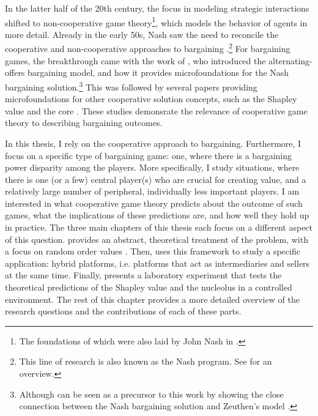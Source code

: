 In the latter half of the 20th century, the focus in modeling strategic interactions shifted to non-cooperative game theory\footnote{
    The foundations of which were also laid by John Nash in \textcite{nash1950non}.
}, which models the behavior of agents in more detail.
Already in the early 50s, Nash saw the need to reconcile the cooperative and non-cooperative approaches to bargaining \parencite{nash1953two}.\footnote{
    This line of research is also known as the Nash program.
    See \textcite{serrano2021sixty} for an overview.
}
For bargaining games, the breakthrough came with the work of \textcite{rubinstein1982perfect}, who introduced the alternating-offers bargaining model, and how it provides microfoundations for the Nash bargaining solution.\footnote{
    Although \textcite{harsanyi1956approaches} can be seen as a precursor to this work by showing the close connection between the Nash bargaining solution \parencite{nash1950bargaining} and Zeuthen's model \parencite{zeuthen1930problems}.
}
This was followed by several papers providing microfoundations for other cooperative solution concepts, such as the Shapley value \parencite[e.g.,][]{gul1989bargaining,winter1994demand,hart1996bargaining,stole1996intra} and the core \parencite[e.g.,][]{serrano1995market}.
These studies demonsrate the relevance of cooperative game theory to describing bargaining outcomes.

In this thesis, I rely on the cooperative approach to bargaining.
Furthermore, I focus on a specific type of bargaining game: one, where there is a bargaining power disparity among the players.
More specifically, I study situations, where there is one (or a few) central player(s) who are crucial for creating value, and a relatively large number of peripheral, individually less important players.
I am interested in what cooperative game theory predicts about the outcome of such games, what the implications of these predictions are, and how well they hold up in practice.
The three main chapters of this thesis each focus on a different aspect of this question.
 provides an abstract, theoretical treatment of the problem, with a focus on random order values \parencite{weber1988probabilistic}. Then,  uses this framework to study a specific application: hybrid platforms, i.e. platforms that act as intermediaries and sellers at the same time.
Finally,  presents a laboratory experiment that tests the theoretical predictions of the Shapley value and the nucleolus in a controlled environment.
The rest of this chapter provides a more detailed overview of the research questions and the contributions of each of these parts.

